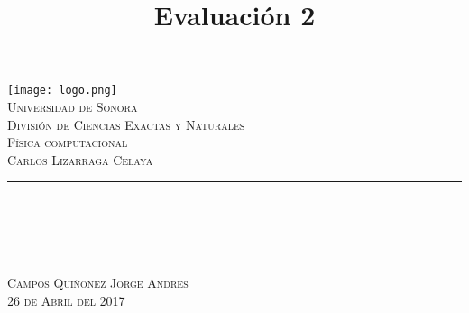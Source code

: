 \documentclass{article}
\title{Evaluación 2}
\makeatletter
\let\thetitle\@title
\makeatother
\begin{document}
\begin{titlepage}
\centering
  \vspace*{0.5 cm}
   \texttt{[image: logo.png]}\\[0.5 cm]%
    \textsc{\LARGE Universidad de Sonora}\\[1.0 cm]	%
	\textsc{\LARGE División de Ciencias Exactas y Naturales}\\[0.5 cm]	
    
	\textsc{\LARGE Física computacional}\\
    \textsc{\Large Carlos Lizarraga Celaya}\\ [0.5 cm]
    \rule{\linewidth}{0.2 mm} \\[0.4 cm]
	{ \huge \bfseries \thetitle}\\
	\rule{\linewidth}{0.2 mm} \\[0.5 cm]
    \textsc{\Large Campos Quiñonez Jorge Andres} \\[0.25 cm]
   \textsc {\large 26 de Abril del 2017} 	

	
 
	\vfill
	
\end{titlepage}
\pagebreak

\newpage

\pagebreak
\end{document}
